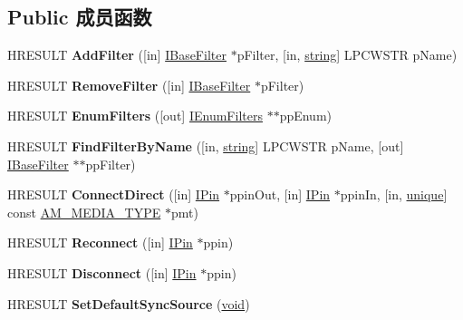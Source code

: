 \subsection*{Public 成员函数}
\begin{DoxyCompactItemize}
\item 
\mbox{\label{interface_i_filter_graph_a9d75386970d93de575872f4c785eabd4}} 
H\+R\+E\+S\+U\+LT {\bfseries Add\+Filter} (\mbox{[}in\mbox{]} \hyperlink{interface_i_base_filter}{I\+Base\+Filter} $\ast$p\+Filter, \mbox{[}in, \hyperlink{structstring}{string}\mbox{]} L\+P\+C\+W\+S\+TR p\+Name)
\item 
\mbox{\label{interface_i_filter_graph_a32381ce317ffb67d88fe56ce912a7653}} 
H\+R\+E\+S\+U\+LT {\bfseries Remove\+Filter} (\mbox{[}in\mbox{]} \hyperlink{interface_i_base_filter}{I\+Base\+Filter} $\ast$p\+Filter)
\item 
\mbox{\label{interface_i_filter_graph_a861402a1ffc893895a983c87fe6a6e98}} 
H\+R\+E\+S\+U\+LT {\bfseries Enum\+Filters} (\mbox{[}out\mbox{]} \hyperlink{interface_i_enum_filters}{I\+Enum\+Filters} $\ast$$\ast$pp\+Enum)
\item 
\mbox{\label{interface_i_filter_graph_ac9cceca18f09193ba6179d615f88ed69}} 
H\+R\+E\+S\+U\+LT {\bfseries Find\+Filter\+By\+Name} (\mbox{[}in, \hyperlink{structstring}{string}\mbox{]} L\+P\+C\+W\+S\+TR p\+Name, \mbox{[}out\mbox{]} \hyperlink{interface_i_base_filter}{I\+Base\+Filter} $\ast$$\ast$pp\+Filter)
\item 
\mbox{\label{interface_i_filter_graph_a4c274504a524c28d55fe892674e010c8}} 
H\+R\+E\+S\+U\+LT {\bfseries Connect\+Direct} (\mbox{[}in\mbox{]} \hyperlink{interface_i_pin}{I\+Pin} $\ast$ppin\+Out, \mbox{[}in\mbox{]} \hyperlink{interface_i_pin}{I\+Pin} $\ast$ppin\+In, \mbox{[}in, \hyperlink{interfaceunique}{unique}\mbox{]} const \hyperlink{struct_a_m___m_e_d_i_a___t_y_p_e}{A\+M\+\_\+\+M\+E\+D\+I\+A\+\_\+\+T\+Y\+PE} $\ast$pmt)
\item 
\mbox{\label{interface_i_filter_graph_a92fba35a01a7d162bcf44a6ce51d1ebe}} 
H\+R\+E\+S\+U\+LT {\bfseries Reconnect} (\mbox{[}in\mbox{]} \hyperlink{interface_i_pin}{I\+Pin} $\ast$ppin)
\item 
\mbox{\label{interface_i_filter_graph_a3c0768a3aa9663955272ff5e3a31e973}} 
H\+R\+E\+S\+U\+LT {\bfseries Disconnect} (\mbox{[}in\mbox{]} \hyperlink{interface_i_pin}{I\+Pin} $\ast$ppin)
\item 
\mbox{\label{interface_i_filter_graph_aded5530e3db9118ce023221efde3aa66}} 
H\+R\+E\+S\+U\+LT {\bfseries Set\+Default\+Sync\+Source} (\hyperlink{interfacevoid}{void})
\end{DoxyCompactItemize}
